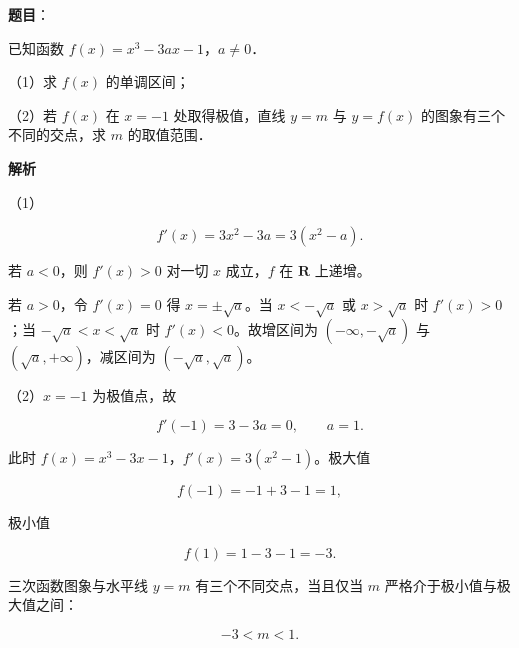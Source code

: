 \begin{answer}

\textbf{题目}：

已知函数 $f(x)=x^3-3ax-1$，$a\neq0$．

（1）求 $f(x)$ 的单调区间；

（2）若 $f(x)$ 在 $x=-1$ 处取得极值，直线 $y=m$ 与 $y=f(x)$ 的图象有三个不同的交点，求 $m$ 的取值范围．

\textbf{解析}

（1）

\nopagebreak[4]
\[f'(x)=3x^2-3a=3(x^2-a).\]

若 $a<0$，则 $f'(x)>0$ 对一切 $x$ 成立，$f$ 在 $\mathbf R$ 上递增。

若 $a>0$，令 $f'(x)=0$ 得 $x=\pm\sqrt a$。当 $x<-\sqrt a$ 或 $x>\sqrt a$ 时 $f'(x)>0$；当 $-\sqrt a<x<\sqrt a$ 时 $f'(x)<0$。故增区间为 $(-\infty,-\sqrt a)$ 与 $(\sqrt a,+\infty)$，减区间为 $(-\sqrt a,\sqrt a)$。

（2）$x=-1$ 为极值点，故

\nopagebreak[4]
\[f'(-1)=3-3a=0,\qquad a=1.\]

此时 $f(x)=x^3-3x-1$，$f'(x)=3(x^2-1)$。极大值

\nopagebreak[4]
\[f(-1)=-1+3-1=1,\]

极小值

\nopagebreak[4]
\[f(1)=1-3-1=-3.\]

三次函数图象与水平线 $y=m$ 有三个不同交点，当且仅当 $m$ 严格介于极小值与极大值之间：

\nopagebreak[4]
\[-3<m<1.\]


\end{answer}
